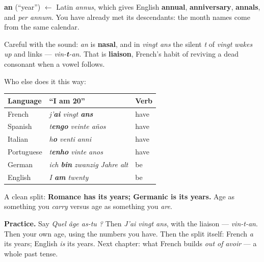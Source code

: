 \begin{cousinweb}
\textbf{an} (``year'') $\leftarrow$ Latin \emph{annus}, which gives English
\textbf{annual}, \textbf{anniversary}, \textbf{annals}, and \emph{per annum}.
You have already met its descendants: the month names come from the same
calendar.
\end{cousinweb}

\begin{sounds}
Careful with the sound: \emph{an} is \textbf{nasal}, and in \emph{vingt ans} the
silent \emph{t} of \emph{vingt} \emph{wakes up} and links ---
\emph{vin-\textbf{t}-an}. That is \textbf{liaison}, French's habit of reviving a
dead consonant when a vowel follows.
\end{sounds}

Who else does it this way:

\begin{center}
\begin{tabular}{@{}lll@{}}
\toprule
Language & ``I am 20'' & Verb \\
\midrule
French & \emph{j'\textbf{ai} vingt \textbf{ans}} & have \\
Spanish & \emph{t\textbf{engo} veinte a\~{n}os} & have \\
Italian & \emph{h\textbf{o} venti anni} & have \\
Portuguese & \emph{t\textbf{enho} vinte anos} & have \\
German & \emph{ich \textbf{bin} zwanzig Jahre alt} & be \\
English & \emph{I \textbf{am} twenty} & be \\
\bottomrule
\end{tabular}
\end{center}

A clean split: \textbf{Romance has its years; Germanic is its years.} Age as
something you \emph{carry} versus age as something you \emph{are}.

\begin{culture}
\textbf{Practice.} Say \emph{Quel \^{a}ge as-tu ?} Then \emph{J'ai vingt ans},
with the liaison --- \emph{vin-t-an}. Then your own age, using the numbers you
have. Then the split itself: French \emph{a} its years; English \emph{is} its
years. Next chapter: what French builds \emph{out of} \emph{avoir} --- a whole
past tense.
\end{culture}
